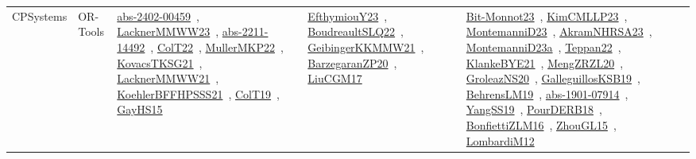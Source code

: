 {\begin{longtable}{lp{3cm}>{\raggedright\arraybackslash}p{6cm}>{\raggedright\arraybackslash}p{6cm}>{\raggedright\arraybackslash}p{8cm}}
CPSystems & OR-Tools & \href{articles/abs-2402-00459.pdf}{abs-2402-00459}~\cite{abs-2402-00459}, \href{articles/LacknerMMWW23.pdf}{LacknerMMWW23}~\cite{LacknerMMWW23}, \href{articles/abs-2211-14492.pdf}{abs-2211-14492}~\cite{abs-2211-14492}, \href{articles/ColT22.pdf}{ColT22}~\cite{ColT22}, \href{articles/MullerMKP22.pdf}{MullerMKP22}~\cite{MullerMKP22}, \href{papers/KovacsTKSG21.pdf}{KovacsTKSG21}~\cite{KovacsTKSG21}, \href{papers/LacknerMMWW21.pdf}{LacknerMMWW21}~\cite{LacknerMMWW21}, \href{articles/KoehlerBFFHPSSS21.pdf}{KoehlerBFFHPSSS21}~\cite{KoehlerBFFHPSSS21}, \href{papers/ColT19.pdf}{ColT19}~\cite{ColT19}, \href{papers/GayHS15.pdf}{GayHS15}~\cite{GayHS15} & \href{papers/EfthymiouY23.pdf}{EfthymiouY23}~\cite{EfthymiouY23}, \href{papers/BoudreaultSLQ22.pdf}{BoudreaultSLQ22}~\cite{BoudreaultSLQ22}, \href{papers/GeibingerKKMMW21.pdf}{GeibingerKKMMW21}~\cite{GeibingerKKMMW21}, \href{papers/BarzegaranZP20.pdf}{BarzegaranZP20}~\cite{BarzegaranZP20}, \href{papers/LiuCGM17.pdf}{LiuCGM17}~\cite{LiuCGM17} & \href{papers/Bit-Monnot23.pdf}{Bit-Monnot23}~\cite{Bit-Monnot23}, \href{papers/KimCMLLP23.pdf}{KimCMLLP23}~\cite{KimCMLLP23}, \href{articles/MontemanniD23.pdf}{MontemanniD23}~\cite{MontemanniD23}, \href{articles/AkramNHRSA23.pdf}{AkramNHRSA23}~\cite{AkramNHRSA23}, \href{articles/MontemanniD23a.pdf}{MontemanniD23a}~\cite{MontemanniD23a}, \href{papers/Teppan22.pdf}{Teppan22}~\cite{Teppan22}, \href{papers/KlankeBYE21.pdf}{KlankeBYE21}~\cite{KlankeBYE21}, \href{articles/MengZRZL20.pdf}{MengZRZL20}~\cite{MengZRZL20}, \href{papers/GroleazNS20.pdf}{GroleazNS20}~\cite{GroleazNS20}, \href{papers/GalleguillosKSB19.pdf}{GalleguillosKSB19}~\cite{GalleguillosKSB19}, \href{papers/BehrensLM19.pdf}{BehrensLM19}~\cite{BehrensLM19}, \href{articles/abs-1901-07914.pdf}{abs-1901-07914}~\cite{abs-1901-07914}, \href{papers/YangSS19.pdf}{YangSS19}~\cite{YangSS19}, \href{articles/PourDERB18.pdf}{PourDERB18}~\cite{PourDERB18}, \href{papers/BonfiettiZLM16.pdf}{BonfiettiZLM16}~\cite{BonfiettiZLM16}, \href{papers/ZhouGL15.pdf}{ZhouGL15}~\cite{ZhouGL15}, \href{articles/LombardiM12.pdf}{LombardiM12}~\cite{LombardiM12}\\

\end{longtable}}
